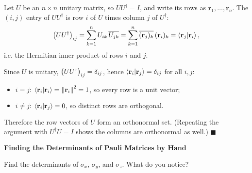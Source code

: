 \documentclass[a4paper, 10pt]{article}
\begin{document}
\begin{solution}
	\noindent Let \( U \) be an \( n \times n \) unitary matrix, so \( UU^{\dagger} = I \), and write its rows as \( \mathbf{r}_1, \dots, \mathbf{r}_n \).
	The \( (i,j) \) entry of \( UU^{\dagger} \) is row \( i \) of \( U \) times column \( j \) of \( U^{\dagger} \):
	\[
		\left(UU^{\dagger}\right)_{ij}
		= \sum_{k=1}^{n} U_{ik}\,\overline{U_{jk}}
		= \sum_{k=1}^{n} \overline{(\mathbf{r}_j)_k}\,(\mathbf{r}_i)_k
		= \braket{\mathbf{r}_j \vert \mathbf{r}_i},
	\]
	i.e. the Hermitian inner product of rows \( i \) and \( j \).

	\noindent Since \( U \) is unitary, \( \left(UU^{\dagger}\right)_{ij} = \delta_{ij} \), hence \( \braket{\mathbf{r}_i \vert \mathbf{r}_j} = \delta_{ij} \) for all \( i, j \):
	\begin{itemize}
		\item \( i = j \): \quad \( \braket{\mathbf{r}_i \vert \mathbf{r}_i} = \left\lVert\mathbf{r}_i\right\rVert^2 = 1 \), so every row is a unit vector;
		\item \( i \neq j \): \quad \( \braket{\mathbf{r}_i \vert \mathbf{r}_j} = 0 \), so distinct rows are orthogonal.
	\end{itemize}
	Therefore the row vectors of \( U \) form an orthonormal set.
	(Repeating the argument with \( U^{\dagger}U = I \) shows the columns are orthonormal as well.) \( \blacksquare \)
\end{solution}

\newpage

\begin{problem}
\textbf{Finding the Determinants of Pauli Matrices by Hand}
\par Find the determinants of \( \sigma_x \), \( \sigma_y \), and \( \sigma_z \).
What do you notice?
\end{problem}
\end{document}
